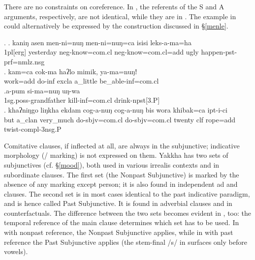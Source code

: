 There are no constraints on coreference. In \Next[a], the referents of the  S and A arguments, respectively, are not identical, while  they are in \Next[b]. The example in \Next[a] could alternatively be expressed by the  construction discussed  in §\ref{menle}. 
		
\ex. \ag.	kaniŋ asen      men-ni=nuŋ         men-ni=nuŋ=ca                isisi leks-a-ma=ha\\
{\sc  1pl[erg]} yesterday {\sc neg-}know{\sc =com.cl} {\sc neg-}know{\sc =com.cl=add} ugly happen{\sc [3sg]-pst-prf=nmlz.nsg}\\
 
\bg. kam=ca         cok-ma            haʔlo mimik,   ya-ma=nuŋǃ\\
work{\sc =add} do{\sc -inf} {\sc excla} a\_little be\_able{\sc -inf=com.cl}\\
   
\bg.a-pum si-ma=nuŋ uŋ-wa\\
{\sc 1sg.poss-}grandfather kill{\sc -inf=com.cl} drink{\sc -npst[3.P]}\\
	   \bg.	khaʔniŋgo liŋkha   ekdam     cog-a-nuŋ        cog-a-nuŋ       bis  wora khibak=ca  ipt-i-ci\\
	but a\_clan very\_much do{\sc [3sg]-sbjv=com.cl} do{\sc [3sg]-sbjv=com.cl} twenty {\sc clf}  rope{\sc =add} twist{\sc [3sg.A]-compl-3nsg.P}\\
		 	


Comitative clauses, if inflected at all, are always in the subjunctive; indicative morphology (/ marking) is not expressed on them. Yakkha has two sets of subjunctives (cf. §\ref{mood}), both used in various irrealis contexts and in subordinate clauses. The first set (the Nonpast Subjunctive) is marked by the absence of any marking except person; it is also found in independent ad and  clauses. The second set is in most cases identical to the past indicative paradigm, and is hence called Past Subjunctive. It is found in adverbial clauses and in counterfactuals. The difference between the two sets becomes evident in , too: the temporal reference of the main clause determines which set has to be used. In \Next[a] with nonpast reference, the Nonpast Subjunctive applies, while in \Next[b] with past reference the Past Subjunctive applies (the stem-final /s/ in \Next[b] surfaces only before vowels).


